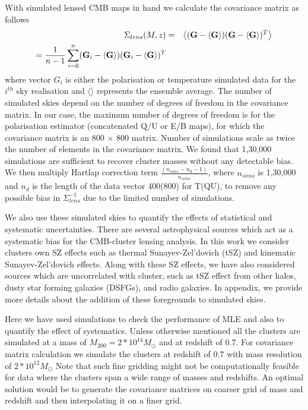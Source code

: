  
 With simulated lensed CMB maps in hand we calculate the covariance matrix as follows
 \begin{eqnarray}
\Sigma_{lens}(M,z) & = & \left<(\textrm{\textbf{G}} - \left<\textrm{\textbf{G}}\right>) (\textrm{\textbf{G}} - \left<\textrm{\textbf{G}}\right>)^{T}\right>\\
  =   \frac{1}{n-1}\sum\limits_{i = 0}^{n} (\textrm{\textbf{G}}_{i} - \left<\textrm{\textbf{G}}\right>) (\textrm{\textbf{G}}_{i} - \left<\textrm{\textbf{G}}\right>)^{T} %
\label{eq_lensed_cmb_cov_mass_z}
\end{eqnarray}
 where vector $G_{i}$ is either the polarisation or temperature simulated data for the $i^{th}$ sky realisation and $\langle \rangle$ represents the ensemble average. 
 The number of simulated skies depend on the number of degrees of freedom in the covariance matrix. 
 In our case, the maximum number of degrees of freedom is for the polarisation estimator (concatenated Q/U or E/B maps), for which the covariance matrix is an 800 $\times$ 800 matrix. %
 Number of simulations scale as twice the number of elements in the covariance matrix. 
  We found that 1,30,000 simulations are sufficient to recover cluster masses without any detectable bias. 
  We then multiply Hartlap correction term $\frac{(n_{sims} -n_{d} -1)}{n_{sims}}$, where $n_{sims}$ is 1,30,000 and $n_{d}$ is the length of the data vector 400(800) for T(QU), to remove any possible bias in $\Sigma^{-1}_{lens}$ due to the limited number of simulations. 
  
 We also use these simulated skies to quantify the effects of statistical and systematic uncertainties.
 There are several astrophysical sources which act as a systematic bias for the CMB-cluster lensing analysis. 
 In this work we consider clusters own SZ effects such as thermal Sunayev-Zel'dovich (tSZ) and kinematic Sunayev-Zel'dovich effects. 
 Along with these SZ effects, we have also considered sources which are uncorrelated with cluster, such as tSZ effect from other halos, dusty star forming galaxies (DSFGs), and radio galaxies.
 In appendix, we provide more details about the addition of these foregrounds to simulated skies.
 
Here we have used simulations to check the performance of MLE and also to quantify the effect of systematics. 
 Unless otherwise mentioned all the clusters are simulated at a mass of $M_{200} = 2*10^{14} M_{\odot}$ %
 and at redshift of 0.7.
 For covariance matrix calculation we simulate the clusters at redshift of $0.7$ with mass resolution of $2*10^{12} M_{\odot}$
 Note that such fine gridding might not be computationally feasible for data where the clusters span a wide range of masses and redshifts.
 An optimal solution would be to generate the covariance matrices on coarser grid of mass and redshift and then interpolating it on a finer grid.  
 
